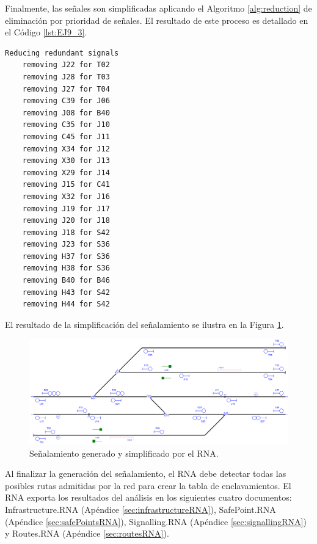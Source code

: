Finalmente, las señales son simplificadas aplicando el Algoritmo \ref{alg:reduction} de eliminación por prioridad de señales. El resultado de este proceso es detallado en el Código \ref{lst:EJ9_3}.

\begin{lstlisting}[language = {}, caption = Reducción de señalamiento por prioridad de señales, label = {lst:EJ9_3}]
	Reducing redundant signals
	removing J22 for T02
	removing J28 for T03
	removing J27 for T04
	removing C39 for J06
	removing J08 for B40
	removing C35 for J10
	removing C45 for J11
	removing X34 for J12
	removing X30 for J13
	removing X29 for J14
	removing J15 for C41
	removing X32 for J16
	removing J19 for J17
	removing J20 for J18
	removing J18 for S42
	removing J23 for S36
	removing H37 for S36
	removing H38 for S36
	removing B40 for B46
	removing H43 for S42
	removing H44 for S42
\end{lstlisting}

	El resultado de la simplificación del señalamiento se ilustra en la Figura \ref{fig:EJ9_7}.
	
	\begin{figure}[H]
		\centering
		\includegraphics[width=1\textwidth]{resultados-obtenidos/ejemplo1/images/1_RNA.png}
		\centering\caption{Señalamiento generado y simplificado por el RNA.}
		\label{fig:EJ9_7}
	\end{figure}
	
	Al finalizar la generación del señalamiento, el RNA debe detectar todas las posibles rutas admitidas por la red para crear la tabla de enclavamientos. El RNA exporta los resultados del análisis en los siguientes cuatro documentos: Infrastructure.RNA (Apéndice \ref{sec:infrastructureRNA}), SafePoint.RNA (Apéndice \ref{sec:safePointsRNA}), Signalling.RNA (Apéndice \ref{sec:signallingRNA}) y Routes.RNA (Apéndice \ref{sec:routesRNA}).